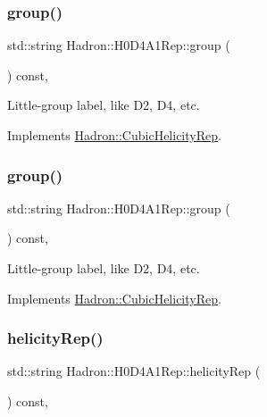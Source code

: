 \subsubsection{\texorpdfstring{group()}{group()}\hspace{0.1cm}{\footnotesize\ttfamily [2/3]}}
{\footnotesize\ttfamily std\+::string Hadron\+::\+H0\+D4\+A1\+Rep\+::group (\begin{DoxyParamCaption}{ }\end{DoxyParamCaption}) const\hspace{0.3cm}{\ttfamily [inline]}, {\ttfamily [virtual]}}

Little-\/group label, like D2, D4, etc. 

Implements \mbox{\hyperlink{structHadron_1_1CubicHelicityRep_a101a7d76cd8ccdad0f272db44b766113}{Hadron\+::\+Cubic\+Helicity\+Rep}}.

\mbox{\label{structHadron_1_1H0D4A1Rep_abc2f3e6961a83aec1fdfa3909b4925dd}} 
\subsubsection{\texorpdfstring{group()}{group()}\hspace{0.1cm}{\footnotesize\ttfamily [3/3]}}
{\footnotesize\ttfamily std\+::string Hadron\+::\+H0\+D4\+A1\+Rep\+::group (\begin{DoxyParamCaption}{ }\end{DoxyParamCaption}) const\hspace{0.3cm}{\ttfamily [inline]}, {\ttfamily [virtual]}}

Little-\/group label, like D2, D4, etc. 

Implements \mbox{\hyperlink{structHadron_1_1CubicHelicityRep_a101a7d76cd8ccdad0f272db44b766113}{Hadron\+::\+Cubic\+Helicity\+Rep}}.

\mbox{\label{structHadron_1_1H0D4A1Rep_ae4478095b32b0fd6f52f60f7fd489e6d}} 
\subsubsection{\texorpdfstring{helicityRep()}{helicityRep()}\hspace{0.1cm}{\footnotesize\ttfamily [1/2]}}
{\footnotesize\ttfamily std\+::string Hadron\+::\+H0\+D4\+A1\+Rep\+::helicity\+Rep (\begin{DoxyParamCaption}{ }\end{DoxyParamCaption}) const\hspace{0.3cm}{\ttfamily [inline]}, {\ttfamily [virtual]}}

